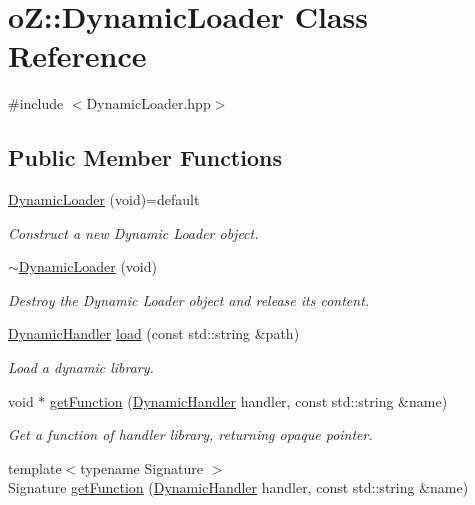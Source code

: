 \hypertarget{classo_z_1_1_dynamic_loader}{}\section{oZ\+::Dynamic\+Loader Class Reference}
\label{classo_z_1_1_dynamic_loader}


{\ttfamily \#include $<$Dynamic\+Loader.\+hpp$>$}

\subsection*{Public Member Functions}
\begin{DoxyCompactItemize}
\item 
\mbox{\hyperlink{classo_z_1_1_dynamic_loader_ab046e300c6645cc5fdb1e3c1d0c4690b}{Dynamic\+Loader}} (void)=default
\begin{DoxyCompactList}\small\item\em Construct a new Dynamic Loader object. \end{DoxyCompactList}\item 
\mbox{\hyperlink{classo_z_1_1_dynamic_loader_a48b8658929c54dbb03a79f752d2fc131}{$\sim$\+Dynamic\+Loader}} (void)
\begin{DoxyCompactList}\small\item\em Destroy the Dynamic Loader object and release its content. \end{DoxyCompactList}\item 
\mbox{\hyperlink{namespaceo_z_acbfabf71824b5fc6a3beb64e397afc19}{Dynamic\+Handler}} \mbox{\hyperlink{classo_z_1_1_dynamic_loader_a1a0201ebc77bdd744aa528d7cb999a89}{load}} (const std\+::string \&path)
\begin{DoxyCompactList}\small\item\em Load a dynamic library. \end{DoxyCompactList}\item 
void $\ast$ \mbox{\hyperlink{classo_z_1_1_dynamic_loader_a136f9d35245f4e3d556d7f4eae951cdf}{get\+Function}} (\mbox{\hyperlink{namespaceo_z_acbfabf71824b5fc6a3beb64e397afc19}{Dynamic\+Handler}} handler, const std\+::string \&name)
\begin{DoxyCompactList}\small\item\em Get a function of handler library, returning opaque pointer. \end{DoxyCompactList}\item 
{\footnotesize template$<$typename Signature $>$ }\\Signature \mbox{\hyperlink{classo_z_1_1_dynamic_loader_ad5c090a613bec9cf397a479bf3257cfa}{get\+Function}} (\mbox{\hyperlink{namespaceo_z_acbfabf71824b5fc6a3beb64e397afc19}{Dynamic\+Handler}} handler, const std\+::string \&name)

\end{DoxyCompactItemize}
